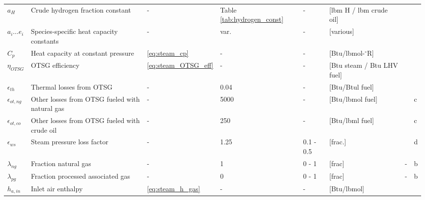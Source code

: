 \documentclass[11pt]{report}
\begin{document}
\begin{landscape}
\begin{scriptsize}
\tablelasttail{\bottomrule}
\label{tab:defaults_steam}
\begin{supertabular*}{1\columnwidth}{p{0.05\columnwidth}p{0.3\columnwidth}p{0.05\columnwidth}p{0.05\columnwidth}p{0.1\columnwidth}p{0.17\columnwidth}p{0.1\columnwidth}p{0.04\columnwidth}}
$a_H$ & Crude hydrogen fraction constant & - & Table \ref{tab:hydrogen_const} & - & [lbm H / lbm crude oil] & \cite{Schmidt1985} & \\
$a_i \ldots e_i $ & Species-specific heat capacity constants & - & var. & - & [various] & \cite{Cengel2006} &\\
$C_{p} $ & Heat capacity at constant pressure & \eqref{eq:steam_cp} & - & - & [Btu/lbmol-$^\circ$R] & &\\
$\eta_{OTSG}$ & OTSG efficiency & \eqref{eq:steam_OTSG_eff} & - & - & [Btu steam / Btu LHV fuel] & & \\
$\epsilon_{th}$ & Thermal losses from OTSG & - & 0.04 & - & [Btu/Btul fuel] & \cite{Ganapathy2003} & \\
$\epsilon_{ot,ng}$ & Other losses from OTSG fueled with natural gas & - & 5000 & - & [Btu/lbmol fuel] & \cite{Ganapathy2003} & c \\
$\epsilon_{ot,co}$ & Other losses from OTSG fueled with crude oil & - & 250 & - & [Btu/lbml fuel] & \cite{Ganapathy2003} & c \\
$\epsilon_{ws}$ & Steam pressure loss factor & - & 1.25 & 0.1 - 0.5 & [frac.] & \cite{Chilingarian1987} & d \\
$\lambda_{ng}$ & Fraction natural gas & - & 1 & 0 - 1 & [frac] & - & b \\
$\lambda_{pg}$ & Fraction processed associated gas & - & 0 & 0 - 1 & [frac] & - & b \\
$h_{a,in} $ & Inlet air enthalpy & \eqref{eq:steam_h_gas} & - & - & [Btu/lbmol] & & \\

\end{supertabular*}
\end{scriptsize}
\end{landscape}
\end{document}
